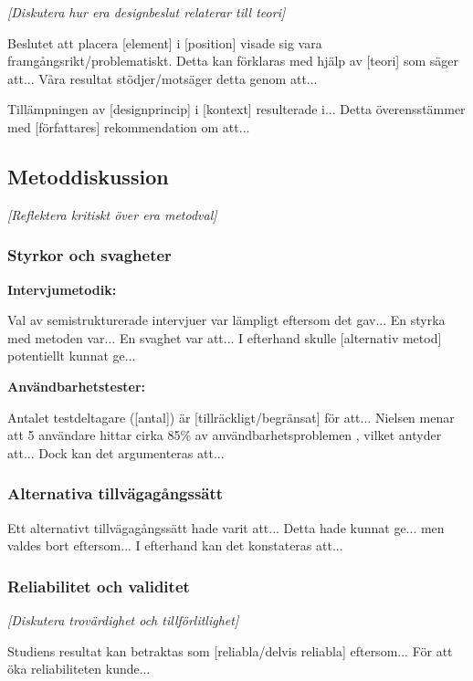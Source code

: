 \textit{[Diskutera hur era designbeslut relaterar till teori]}

Beslutet att placera [element] i [position] visade sig vara framgångsrikt/problematiskt. Detta kan förklaras med hjälp av [teori] som säger att... Våra resultat stödjer/motsäger detta genom att...

Tillämpningen av [designprincip] i [kontext] resulterade i... Detta överensstämmer med [författares] rekommendation om att...


\subsection{Metoddiskussion}

\textit{[Reflektera kritiskt över era metodval]}

\subsubsection{Styrkor och svagheter}

\textbf{Intervjumetodik:}

Val av semistrukturerade intervjuer var lämpligt eftersom det gav... En styrka med metoden var... En svaghet var att... I efterhand skulle [alternativ metod] potentiellt kunnat ge...

\textbf{Användbarhetstester:}

Antalet testdeltagare ([antal]) är [tillräckligt/begränsat] för att... Nielsen menar att 5 användare hittar cirka 85\% av användbarhetsproblemen \cite{nielsen2012}, vilket antyder att... Dock kan det argumenteras att...


\subsubsection{Alternativa tillvägagångssätt}

Ett alternativt tillvägagångssätt hade varit att... Detta hade kunnat ge... men valdes bort eftersom... I efterhand kan det konstateras att...


\subsubsection{Reliabilitet och validitet}

\textit{[Diskutera trovärdighet och tillförlitlighet]}

Studiens resultat kan betraktas som [reliabla/delvis reliabla] eftersom... För att öka reliabiliteten kunde...

